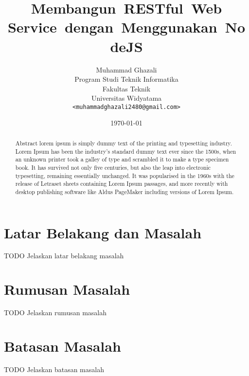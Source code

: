 \documentclass[a4paper, 12pt]{report}
\title{\textbf{Membangun\ RESTful\ Web Service\ dengan\ Menggunakan\ NodeJS}}
\author{
Muhammad Ghazali\\
Program Studi Teknik Informatika\\
Fakultas Teknik\\
Universitas Widyatama
\\ \texttt{<muhammadghazali2480@gmail.com>}
}
\date{\today}
\begin{document}
\maketitle

\tableofcontents
\setcounter{tocdepth}{3}

\listoffigures
\listoftables

\begin{abstract}
Abstract lorem ipsum is simply dummy text of the printing and typesetting industry. Lorem Ipsum has been the industry's standard dummy text ever since the 1500s, when an unknown printer took a galley of type and scrambled it to make a type specimen book. It has survived not only five centuries, but also the leap into electronic typesetting, remaining essentially unchanged. It was popularised in the 1960s with the release of Letraset sheets containing Lorem Ipsum passages, and more recently with desktop publishing software like Aldus PageMaker including versions of Lorem Ipsum.
\end{abstract}

\section*{Latar Belakang dan Masalah}
\begin{flushleft}
TODO Jelaskan latar belakang masalah
\end{flushleft}

\section*{Rumusan Masalah}
\begin{flushleft}
TODO Jelaskan rumusan masalah
\end{flushleft}

\section*{Batasan Masalah}
\begin{flushleft}
TODO Jelaskan batasan masalah
\end{flushleft}
\end{document}
